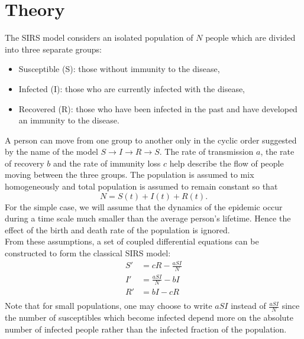 \documentclass[prb,aps,twocolumn,showpacs,10pt]{revtex4-1}
\begin{document}
\section{Theory}
The SIRS model considers an isolated population of $N$ people which are divided into three separate groups: 
\begin{itemize}
\item Susceptible (S): those without immunity to the disease,
\item Infected (I): those who are currently infected with the disease,
\item Recovered (R): those who have been infected in the past and have developed an immunity to the disease.
\end{itemize}
A person can move from one group to another only in the cyclic order suggested by the name of the model $S\rightarrow I \rightarrow R \rightarrow S$. The rate of transmission $a$, the rate of recovery $b$ and the rate of immunity loss $c$ help describe the flow of people moving between the three groups. The population is assumed to mix homogeneously and total population is assumed to remain constant so that
\begin{equation}
N = S(t)+I(t)+R(t).
\end{equation} 
For the simple case, we will assume that the dynamics of the epidemic occur during a time scale much smaller than the average person's lifetime. Hence the effect of the birth and death rate of the population is ignored.\\

From these assumptions, a set of coupled differential equations can be constructed to form the classical SIRS model:
\begin{equation}
\begin{split}
S'&=cR-\frac{aSI}{N}\\
I'&=\frac{aSI}{N}-bI\\
R'&=bI-cR\\
\end{split}
\end{equation}
Note that for small populations, one may choose to write $aSI$ instead of $\frac{aSI}{N}$ since the number of susceptibles which become infected depend more on the absolute number of infected people rather than the infected fraction of the population.\\
\end{document}
